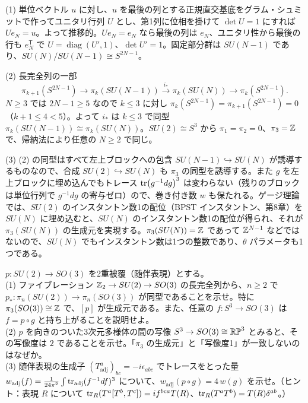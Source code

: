 \begin{solution}
(1) 単位ベクトル $u$ に対し、$u$ を最後の列とする正規直交基底をグラム・シュミットで作ってユニタリ行列 $U$ とし、第1列に位相を掛けて $\det U=1$ にすれば $Ue_N=u$。よって推移的。$Ue_N=e_N$ なら最後の列は $e_N$、ユニタリ性から最後の行も $e_N^{\mathsf T}$ で $U=\operatorname{diag}(U',1)$、$\det U'=1$。固定部分群は $SU(N-1)$ であり、$SU(N)/SU(N-1)\cong S^{2N-1}$。

(2) 長完全列の一部
\[
\pi_{k+1}(S^{2N-1})\to\pi_k(SU(N-1))\xrightarrow{i_*}\pi_k(SU(N))\to\pi_k(S^{2N-1}).
\]
$N\ge3$ では $2N-1\ge5$ なので $k\le3$ に対し $\pi_k(S^{2N-1})=\pi_{k+1}(S^{2N-1})=0$（$k+1\le4<5$）。よって $i_*$ は $k\le3$ で同型 $\pi_k(SU(N-1))\cong\pi_k(SU(N))$。$SU(2)\cong S^3$ から $\pi_1=\pi_2=0$、$\pi_3=\mathbb{Z}$ で、帰納法により任意の $N\ge2$ で同じ。

(3) (2) の同型はすべて左上ブロックへの包含 $SU(N-1)\hookrightarrow SU(N)$ が誘導するものなので、合成 $SU(2)\hookrightarrow SU(N)$ も $\pi_3$ の同型を誘導する。また $g$ を左上ブロックに埋め込んでもトレース $\tr(g^{-1}dg)^3$ は変わらない（残りのブロックは単位行列で $g^{-1}dg$ の寄与ゼロ）ので、巻き付き数 $w$ も保たれる。ゲージ理論では、$SU(2)$ のインスタントン数1の配位（BPST インスタントン、第8章）を $SU(N)$ に埋め込むと、$SU(N)$ のインスタントン数1の配位が得られ、それが $\pi_3(SU(N))$ の生成元を実現する。$\pi_3(SU(N))=\mathbb{Z}$ であって $\mathbb{Z}^{N-1}$ などではないので、$SU(N)$ でもインスタントン数は1つの整数であり、$\theta$ パラメータも1つである。
\end{solution}

\begin{problem}[難易度 C]\label{ch03-prob-so3}
$p\colon SU(2)\to SO(3)$ を2重被覆（随伴表現）とする。\\
(1) ファイブレーション $\mathbb{Z}_2\to SU(2)\to SO(3)$ の長完全列から、$n\ge2$ で $p_*\colon\pi_n(SU(2))\to\pi_n(SO(3))$ が同型であることを示せ。特に $\pi_3(SO(3))\cong\mathbb{Z}$ で、$[p]$ が生成元である。また、任意の $f\colon S^3\to SO(3)$ は $f=p\circ g$ と持ち上がることを説明せよ。\\
(2) $p$ を向きのついた3次元多様体の間の写像 $S^3\to SO(3)\cong\mathbb{RP}^3$ とみると、その写像度は $2$ であることを示せ。「$\pi_3$ の生成元」と「写像度1」が一致しないのはなぜか。\\
(3) 随伴表現の生成子 $(T^a_{\mathrm{adj}})_{bc}=-i\epsilon_{abc}$ でトレースをとった量 $w_{\mathrm{adj}}(f)=\frac{1}{24\pi^2}\int\tr_{\mathrm{adj}}(f^{-1}df)^3$ について、$w_{\mathrm{adj}}(p\circ g)=4\,w(g)$ を示せ。（ヒント：表現 $R$ について $\tr_R(T^a[T^b,T^c])=if^{bca}T(R)$、$\tr_R(T^aT^b)=T(R)\delta^{ab}$。）
\end{problem}

